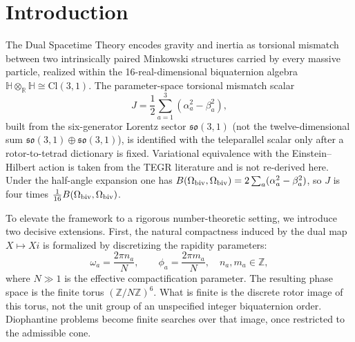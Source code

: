 \documentclass[a4paper]{article}
\theoremstyle{definition}
\theoremstyle{remark}
\begin{document}
\begin{abstract}
starting value up to \(2^{20}\) reaches \(1\), and any other cycle would have normalised height greater than \(100\).

The framework recovers the Teleparallel Equivalent of General Relativity exactly in the continuum limit \(N \to \infty\), while the discrete structure supplies both a number-theoretic foundation and a natural ultraviolet cutoff that eliminates singularities and divergences. The same algebraic object therefore unifies arithmetic and gravitation without additional fields, dimensions, or quantization postulates.

The theory yields concrete physical implications, including discrete gravitational-wave echoes, a finite number of admissible nuclear rotor classes at each compactification \(N\), and discrete torsional corrections to nuclear energy levels. A numerical cutoff \(A_* \lesssim 300\) is an underived heuristic, not a theorem.

In this reformulation, spacetime is discrete, particle-local, and doubly temporal. Gravity is reinterpreted as the torsional misalignment between the intrinsic dual spacetimes carried by each massive particle.
\end{abstract}

\section{Introduction}

The Dual Spacetime Theory encodes gravity and inertia as torsional mismatch between two intrinsically paired Minkowski structures carried by every massive particle, realized within the 16-real-dimensional biquaternion algebra \(\mathbb{H} \otimes_{\mathbb{R}} \mathbb{H} \cong \mathrm{Cl}(3,1)\). The parameter-space torsional mismatch scalar
\[
J = \frac12\sum_{a=1}^3(\alpha_a^2-\beta_a^2),
\]
built from the six-generator Lorentz sector \(\mathfrak{so}(3,1)\) (not the twelve-dimensional sum \(\mathfrak{so}(3,1)\oplus\mathfrak{so}(3,1)\)), is identified with the teleparallel scalar only after a rotor-to-tetrad dictionary is fixed. Variational equivalence with the Einstein--Hilbert action is taken from the TEGR literature and is not re-derived here. Under the half-angle expansion one has \(B(\Omega_{\rm biv},\Omega_{\rm biv})=2\sum_a(\alpha_a^2-\beta_a^2)\), so \(J\) is four times \(\frac1{16}B(\Omega_{\rm biv},\Omega_{\rm biv})\).

To elevate the framework to a rigorous number-theoretic setting, we introduce two decisive extensions. First, the natural compactness induced by the dual map \(X \mapsto Xi\) is formalized by discretizing the rapidity parameters:
\[
\omega_a = \frac{2\pi n_a}{N}, \qquad \phi_a = \frac{2\pi m_a}{N}, \quad n_a,m_a \in \mathbb{Z},
\]
where \(N \gg 1\) is the effective compactification parameter. The resulting phase space is the finite torus \((\mathbb{Z}/N\mathbb{Z})^6\). What is finite is the discrete rotor image of this torus, not the unit group of an unspecified integer biquaternion order. Diophantine problems become finite searches over that image, once restricted to the admissible cone.
\end{document}
